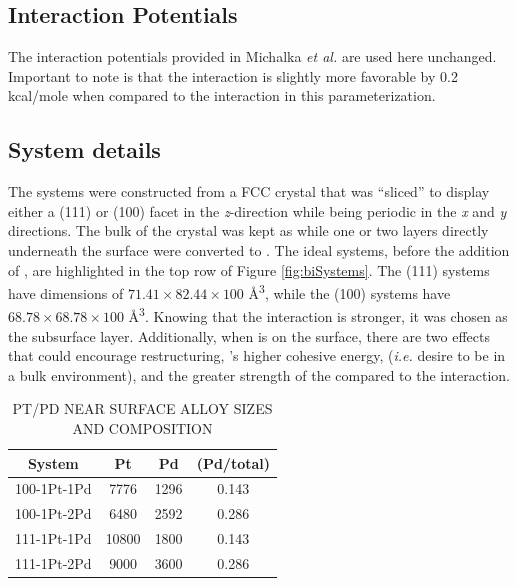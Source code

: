 \subsection{Interaction Potentials}
The interaction potentials provided in Michalka {\em et
al.}\citep{Michalka:2015aa} are used here unchanged. Important to note is that
the  interaction is slightly more favorable by 0.2 kcal/mole
when compared to the  interaction in this parameterization.

\subsection{System details}
The systems were constructed from a FCC  crystal that was ``sliced'' to
display either a (111) or (100) facet in the {\em z}-direction while being
periodic in the {\em x} and {\em y} directions. The bulk of the crystal was
kept as  while one or two layers directly underneath the surface were
converted to . The ideal systems, before the addition of , are
highlighted in the top row of Figure \ref{fig:biSystems}. The (111) systems
have dimensions of $71.41\times82.44\times100$ \AA\textsuperscript{3}, while
the (100) systems have $68.78\times68.78\times100$ \AA\textsuperscript{3}.
Knowing that the  interaction is stronger, it was chosen as
the subsurface layer. Additionally, when  is on the surface, there are
two effects that could encourage restructuring, 's higher cohesive
energy, ({\em i.e.} desire to be in a bulk environment), and the greater
strength of the  compared to the 
interaction.

\begin{table}
  \caption{PT/PD NEAR SURFACE ALLOY SIZES AND COMPOSITION}
  \centering
  \begin{threeparttable}
  \begin{tabular}{ c ccc }
  \hline
  \hline
  \textbf{System} & \textbf{Pt} & \textbf{Pd} &  \textbf{(Pd/total)} \\
  \hline
  100-1Pt-1Pd & 7776 & 1296  & 0.143 \\
  100-1Pt-2Pd & 6480  & 2592  & 0.286 \\
  111-1Pt-1Pd & 10800  & 1800  & 0.143 \\
  111-1Pt-2Pd & 9000 & 3600  & 0.286 \\
  \hline
  \hline
  \end{tabular}
  \end{threeparttable}
\label{tab:systems1}
\end{table}


